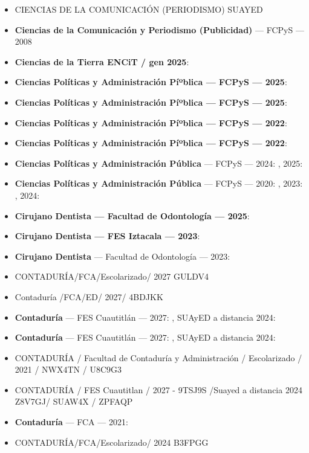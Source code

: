 \begin{itemize}[leftmargin=*]
  \item CIENCIAS DE LA COMUNICACIÓN (PERIODISMO) SUAYED
  \item \textbf{Ciencias de la Comunicación y Periodismo (Publicidad)} --- FCPyS --- 2008
  \item \textbf{Ciencias de la Tierra ENCiT / gen 2025}: 
  \item \textbf{Ciencias Polí­ticas y Administración Píºblica --- FCPyS --- 2025}: 
  \item \textbf{Ciencias Polí­ticas y Administración Píºblica --- FCPyS --- 2025}: 
  \item \textbf{Ciencias Polí­ticas y Administración Píºblica --- FCPyS --- 2022}: 
  \item \textbf{Ciencias Polí­ticas y Administración Píºblica --- FCPyS --- 2022}: 
  \item \textbf{Ciencias Políticas y Administración Pública} --- FCPyS --- 2024: , 2025: 
  \item \textbf{Ciencias Políticas y Administración Pública} --- FCPyS --- 2020: , 2023: , 2024: 
  \item \textbf{Cirujano Dentista --- Facultad de Odontologí­a --- 2025}: 
  \item \textbf{Cirujano Dentista --- FES Iztacala --- 2023}: 
  \item \textbf{Cirujano Dentista} --- Facultad de Odontología --- 2023: 
  \item CONTADURÍA/FCA/Escolarizado/ 2027 GULDV4
  \item Contaduría /FCA/ED/ 2027/ 4BDJKK
  \item \textbf{Contaduría} --- FES Cuautitlán --- 2027: , SUAyED a distancia 2024: 
  \item \textbf{Contaduría} --- FES Cuautitlán --- 2027: , SUAyED a distancia 2024: 
  \item CONTADURÍA / Facultad de Contaduría y Administración / Escolarizado / 2021 / NWX4TN / U8C9G3
  \item CONTADURÍA / FES Cuautitlan / 2027 - 9TSJ9S /Suayed a distancia 2024 Z8V7GJ/ SUAW4X / ZPFAQP
  \item \textbf{Contaduría} --- FCA --- 2021: 
  \item CONTADURÍA/FCA/Escolarizado/ 2024 B3FPGG

\end{itemize}

